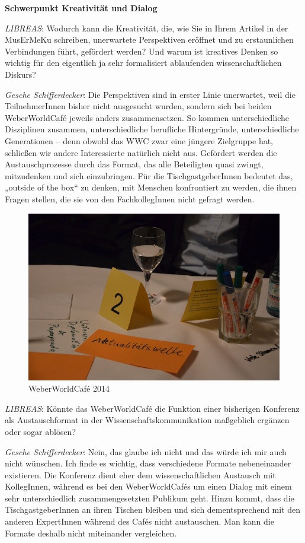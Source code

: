 \documentclass[a4paper,
fontsize=11pt,
oneside,
numbers=noperiodatend,
parskip=half-,
bibliography=totoc,
final
]{scrartcl}
\begin{document}
\textbf{Schwerpunkt Kreativität und Dialog}

\emph{LIBREAS}: Wodurch kann die Kreativität, die, wie Sie in Ihrem
Artikel in der MusErMeKu schreiben, unerwartete Perspektiven eröffnet
und zu erstaunlichen Verbindungen führt, gefördert werden? Und warum ist
kreatives Denken so wichtig für den eigentlich ja sehr formalisiert
ablaufenden wissenschaftlichen Diskurs?

\emph{Gesche Schifferdecker}: Die Perspektiven sind in erster Linie
unerwartet, weil die TeilnehmerInnen bisher nicht ausgesucht wurden,
sondern sich bei beiden WeberWorldCafé jeweils anders zusammensetzen. So
kommen unterschiedliche Disziplinen zusammen, unterschiedliche
berufliche Hintergründe, unterschiedliche Generationen -- denn obwohl
das WWC zwar eine jüngere Zielgruppe hat, schließen wir andere
Interessierte natürlich nicht aus. Gefördert werden die
Austauschprozesse durch das Format, das alle Beteiligten quasi zwingt,
mitzudenken und sich einzubringen. Für die TischgastgeberInnen bedeutet
das, „outside of the box`` zu denken, mit Menschen konfrontiert zu
werden, die ihnen Fragen stellen, die sie von den FachkollegInnen nicht
gefragt werden.

\begin{figure}[htbp]
\centering
\includegraphics{wwc2.jpg}
\caption{WeberWorldCafé 2014}
\end{figure}

\emph{LIBREAS}: Könnte das WeberWorldCafé die Funktion einer bisherigen
Konferenz als Austauschformat in der Wissenschaftskommunikation
maßgeblich ergänzen oder sogar ablösen?

\emph{Gesche Schifferdecker}: Nein, das glaube ich nicht und das würde
ich mir auch nicht wünschen. Ich finde es wichtig, dass verschiedene
Formate nebeneinander existieren. Die Konferenz dient eher dem
wissenschaftlichen Austausch mit KollegInnen, während es bei den
WeberWorldCafés um einen Dialog mit einem sehr unterschiedlich
zusammengesetzten Publikum geht. Hinzu kommt, dass die
TischgastgeberInnen an ihren Tischen bleiben und sich dementsprechend
mit den anderen ExpertInnen während des Cafés nicht austauschen. Man
kann die Formate deshalb nicht miteinander vergleichen.
\end{document}
